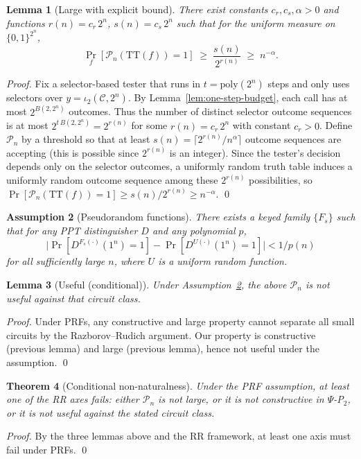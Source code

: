\documentclass[11pt]{article}
\newtheorem{theorem}{Theorem}[section]
\newtheorem{lemma}[theorem]{Lemma}
\newtheorem{assumption}[theorem]{Assumption}
\theoremstyle{definition}
\newcommand{\PSi}{\Psi}
\begin{document}
\begin{lemma}[Large with explicit bound]
There exist constants $c_r,c_s,\alpha>0$ and functions $r(n)=c_r\,2^n$, $s(n)=c_s\,2^n$ such that for the uniform measure on $\{0,1\}^{2^n}$,
\[
\Pr_{f}[\mathcal{P}_n(\mathrm{TT}(f))=1] \;\ge\; \frac{s(n)}{2^{r(n)}} \;\ge\; n^{-\alpha}.
\]
\end{lemma}
\begin{proof}
Fix a selector-based tester that runs in $t=\mathrm{poly}(2^n)$ steps and only uses selectors over $y=\iota_2(\mathcal{C},2^n)$. By Lemma~\ref{lem:one-step-budget}, each call has at most $2^{B(2,2^n)}$ outcomes. Thus the number of distinct selector outcome sequences is at most $2^{t\,B(2,2^n)}=2^{r(n)}$ for some $r(n)=c_r\,2^n$ with constant $c_r>0$. Define $\mathcal{P}_n$ by a threshold so that at least $s(n)=\lceil 2^{r(n)}/n^{\alpha}\rceil$ outcome sequences are accepting (this is possible since $2^{r(n)}$ is an integer). Since the tester’s decision depends only on the selector outcomes, a uniformly random truth table induces a uniformly random outcome sequence among these $2^{r(n)}$ possibilities, so
\(\Pr[\mathcal{P}_n(\mathrm{TT}(f))=1]\ge s(n)/2^{r(n)}\ge n^{-\alpha}.\)
\qed
\end{proof}

\begin{assumption}[Pseudorandom functions]
\label{asm:prf}
There exists a keyed family $\{F_s\}$ such that for any PPT distinguisher $D$ and any polynomial $p$, 
\[
\big|\Pr[D^{F_s(\cdot)}(1^n)=1]-\Pr[D^{U(\cdot)}(1^n)=1]\big|<1/p(n)
\]
for all sufficiently large $n$, where $U$ is a uniform random function.
\end{assumption}

\begin{lemma}[Useful (conditional)]
Under Assumption~\ref{asm:prf}, the above $\mathcal{P}_n$ is not useful against that circuit class.
\end{lemma}
\begin{proof}
Under PRFs, any constructive and large property cannot separate all small circuits by the Razborov--Rudich argument. Our property is constructive (previous lemma) and large (previous lemma), hence not useful under the assumption. \qed
\end{proof}

\begin{theorem}[Conditional non-naturalness]
Under the PRF assumption, at least one of the RR axes fails: either $\mathcal{P}_n$ is not large, or it is not constructive in $\PSi$-P$_2$, or it is not useful against the stated circuit class.
\end{theorem}
\begin{proof}
By the three lemmas above and the RR framework, at least one axis must fail under PRFs. \qed
\end{proof}
\end{document}
